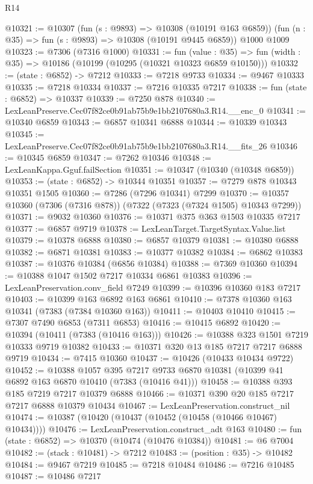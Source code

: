 \begin{lexlean}{R14}
\begin{coremodule}
@10321 := @10307
    (fun (s : @9893) => @10308 (@10191 @163 @6859))
    (fun (n : @35) => fun (s : @9893) => @10308 (@10191 @9445 @6859))
    @1000
    @1009
@10323 := @7306 (@7316 @1000)
@10331 := fun (value : @35) =>
  fun (width : @35) => @10186 (@10199 (@10295 (@10321 @10323 @6859 @10150)))
@10332 := (state : @6852) -> @7212
@10333 := @7218 @9733
@10334 := @9467 @10333
@10335 := @7218 @10334
@10337 := @7216 @10335 @7217
@10338 := fun (state : @6852) => @10337
@10339 := @7250 @878
@10340 := LexLeanPreserve.Cec07f82ce0b91ab75b9e1bb2107680a3.R14.__enc_0
@10341 := @10340 @6859
@10343 := @6857 @10341 @6888
@10344 := @10339 @10343
@10345 := LexLeanPreserve.Cec07f82ce0b91ab75b9e1bb2107680a3.R14.__fits_26
@10346 := @10345 @6859
@10347 := @7262 @10346
@10348 := LexLeanKappa.Gguf.failSection
@10351 := @10347 (@10340 (@10348 @6859))
@10353 := (state : @6852) -> @10344 @10351
@10357 := @7279 @878 @10343 @10351 @1505
@10360 := @7286 (@7296 @10341) @7299
@10370 := @10357 @10360 (@7306 (@7316 @878)) (@7322 (@7323 (@7324 @1505) @10343 @7299))
@10371 := @9032 @10360
@10376 := @10371 @375 @363 @1503 @10335 @7217
@10377 := @6857 @9719
@10378 := LexLeanTarget.TargetSyntax.Value.list
@10379 := @10378 @6888
@10380 := @6857 @10379
@10381 := @10380 @6888
@10382 := @6871 @10381
@10383 := @10377 @10382
@10384 := @6862 @10383
@10387 := @10376 @10384 (@6856 @10384)
@10388 := @7369 @10360
@10394 := @10388 @1047 @1502 @7217 @10334 @6861 @10383
@10396 := LexLeanPreservation.conv_field @7249
@10399 := @10396 @10360 @183 @7217
@10403 := @10399 @163 @6892 @163 @6861
@10410 := @7378 @10360 @163 @10341 (@7383 (@7384 @10360 @163))
@10411 := @10403 @10410
@10415 := @7307 @7490 @6853 (@7311 @6853)
@10416 := @10415 @6892
@10420 := @10394 (@10411 (@7383 (@10416 @163)))
@10426 := @10388 @323 @1501 @7219 @10333 @9719 @10382
@10433 := @10371 @320 @13 @185 @7217 @7217 @6888 @9719
@10434 := @7415 @10360
@10437 := @10426 (@10433 @10434 @9722)
@10452 := @10388
    @1057
    @395
    @7217
    @9733
    @6870
    @10381
    (@10399 @41 @6892 @163 @6870 @10410 (@7383 (@10416 @41)))
@10458 := @10388 @393 @185 @7219 @7217 @10379 @6888
@10466 := @10371 @390 @20 @185 @7217 @7217 @6888 @10379 @10434
@10467 := LexLeanPreservation.construct_nil
@10474 := @10387 (@10420 (@10437 (@10452 (@10458 (@10466 @10467) @10434))))
@10476 := LexLeanPreservation.construct_adt @163
@10480 := fun (state : @6852) => @10370 (@10474 (@10476 @10384))
@10481 := @6 @7004
@10482 := (stack : @10481) -> @7212
@10483 := (position : @35) -> @10482
@10484 := @9467 @7219
@10485 := @7218 @10484
@10486 := @7216 @10485
@10487 := @10486 @7217

\end{coremodule}
\end{lexlean}
